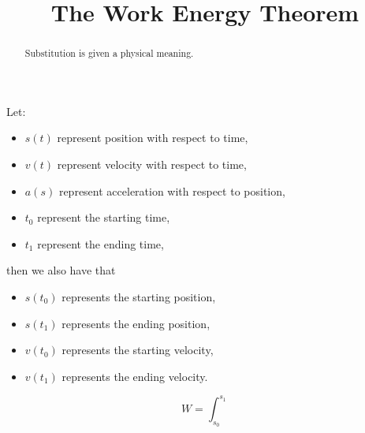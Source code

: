 \documentclass{ximera}
\title[Dig-In:]{The Work Energy Theorem}
\begin{document}
\begin{abstract}
  Substitution is given a physical meaning. 
\end{abstract}
\maketitle

Let:
\begin{itemize}
\item $s(t)$ represent position with respect to time,
\item $v(t)$ represent velocity with respect to time,
\item $a(s)$ represent acceleration with respect to position,
\item $t_0$ represent the starting time,
\item $t_1$ represent the ending time,
\end{itemize}
then we also have that
\begin{itemize}
\item $s(t_0)$ represents the starting position,
\item $s(t_1)$ represents the ending position,
\item $v(t_0)$ represents the starting velocity,
\item $v(t_1)$ represents the ending velocity.
\end{itemize}

\[
W = \int_{s_0}^{s_1} %
\]
\end{document}
